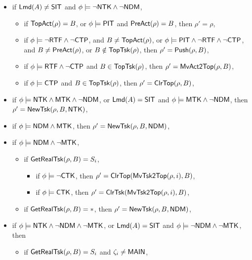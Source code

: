{\noindent {}
\begin{itemize}
	\item if ${\sf Lmd}(A) \neq {\sf SIT}$ and $\phi \models \neg {\sf NTK}\wedge\neg{\sf NDM}$, 
	\begin{itemize}
		\item if $\mathsf{TopAct}(\rho) = B$, or $\phi\models{\sf PIT}$ and $\mathsf{PreAct}(\rho) = B$, then $\rho'= \rho$,
        \item if $\phi \models  \neg {\sf RTF}\wedge \neg {\sf CTP}$, and $B\neq\mathsf{TopAct}(\rho)$,
        or $\phi \models {\sf PIT}\wedge\neg {\sf RTF}\wedge \neg {\sf CTP}$, and $B\neq\mathsf{PreAct}(\rho)$,
        or $B\notin \mathsf{TopTsk}(\rho)$, then $\rho'=\mathsf{Push}(\rho, B)$,
        \item if $\phi \models {\sf RTF} \wedge \neg {\sf CTP}$ and $B \in \mathsf{TopTsk}(\rho)$, then
            $\rho'=\mathsf{MvAct2Top}(\rho, B)$,
        \item if $\phi \models{\sf CTP}$ and $B \in \mathsf{TopTsk}(\rho)$, then
            $\rho' =\mathsf{ClrTop}(\rho, B)$,
	\end{itemize}
	\item if $\phi \models {\sf NTK}\wedge {\sf MTK}\wedge\neg{\sf NDM}$, or ${\sf Lmd}(A) = {\sf SIT}$ and $\phi \models {\sf MTK}\wedge\neg{\sf NDM}$, then $\rho' = \mathsf{NewTsk}(\rho, B, {\sf NTK})$,
	\item if $\phi \models {\sf NDM}\wedge  {\sf MTK}$, then $\rho' = \mathsf{NewTsk}(\rho, B, {\sf NDM})$,
	\item if $\phi \models {\sf NDM}\wedge\neg{\sf MTK}$, 
    \begin{itemize}
        \item if $\mathsf{GetRealTsk}(\rho,B) = S_i$, 
        \begin{itemize}
            \item if $\phi\models\neg{\sf CTK}$, then $\rho'=\mathsf{ClrTop}(\mathsf{MvTsk2Top}(\rho,i), B)$,
            \item if $\phi\models{\sf CTK}$, then $\rho' = \mathsf{ClrTsk}(\mathsf{MvTsk2Top}(\rho,i),B)$,
        \end{itemize}
        \item if $\mathsf{GetRealTsk}(\rho,B) = *$, then $\rho'=\mathsf{NewTsk}(\rho,B,{\sf NDM})$,
    \end{itemize}
	\item if $\phi \models {\sf NTK}\wedge\neg{\sf NDM}\wedge \neg {\sf MTK}$, or ${\sf Lmd}(A) = {\sf SIT}$ and $\phi  \models\neg{\sf NDM}\wedge \neg {\sf MTK}$, then
	\begin{itemize}
        \item if $\mathsf{GetRealTsk}(\rho, B) = S_i$ and $\zeta_i\neq{\sf MAIN}$,

\end{itemize}
\end{itemize}}
